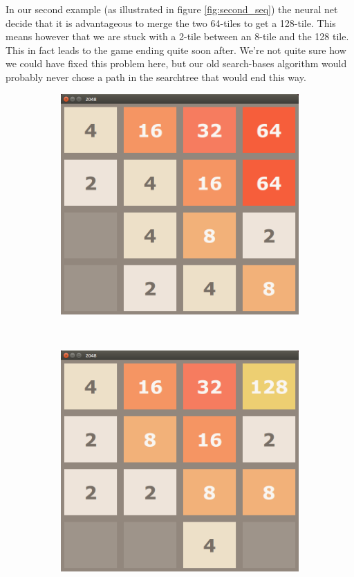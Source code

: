 \documentclass[11pt,a4paper]{article}
\begin{document}
In our second example (as illustrated in figure \ref{fig:second_seq}) the neural net decide that it is advantageous to merge the two 64-tiles to get a 128-tile. This means however that we are stuck with a 2-tile between an 8-tile and the 128 tile. This in fact leads to the game ending quite soon after. We're not quite sure how we could have fixed this problem here, but our old search-bases algorithm would probably never chose a path in the searchtree that would end this way.

\begin{figure}[h!]
    \centering
    \begin{subfigure}[b]{0.45\textwidth}
        \includegraphics[width=\textwidth]{figures/64}
    \end{subfigure}
    ~
    \begin{subfigure}[b]{0.45\textwidth}
        \includegraphics[width=\textwidth]{figures/128}

\end{subfigure}
\end{figure}
\end{document}
